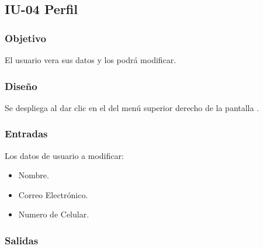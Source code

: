 \newpage
\subsection{IU-04 Perfil}

\subsubsection{Objetivo}
	El usuario vera sus datos y los podrá modificar.

\subsubsection{Diseño}
	Se despliega al dar clic en el  del menú superior derecho de la pantalla .


\subsubsection{Entradas}
Los datos de usuario a modificar:
\begin{itemize}
	\item Nombre.
	\item Correo Electrónico.
	\item Numero de Celular.
\end{itemize}

\subsubsection{Salidas}
\begin{Citemize}
	\item {}
	\item {}
	\item {}
	\item {}
	\item {}
\end{Citemize}